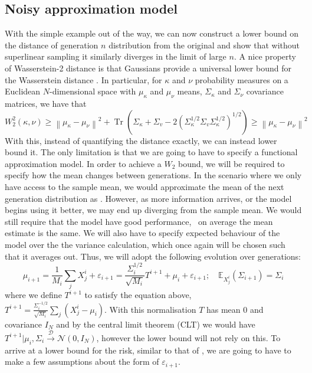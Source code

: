 \subsection{Noisy approximation model}
\label{sec:noisyapprox}
With the simple example out of the way, we can now construct a lower bound on the distance of generation $n$ distribution from the original and show that without superlinear sampling it similarly diverges in the limit of large $n$.
A nice property of Wasserstein-2 distance is that Gaussians provide a universal lower bound for the Wasserstein distance \citep{gelbrich1990formula}. In particular, for $\kappa$ and $\nu$  probability measures on a Euclidean $N$-dimensional space with $\mu_\kappa$ and $\mu_\nu$ means, $\Sigma_\kappa$ and $\Sigma_\nu$ covariance matrices, we have that
$$
W^2_2(\kappa, \nu) \geq\left\|\mu_\kappa-\mu_\nu\right\|^2+
\operatorname{Tr}\left(\Sigma_\kappa+\Sigma_v-2\left(\Sigma_\kappa^{1 / 2} \Sigma_v \Sigma_\kappa^{1 / 2}\right)^{1 / 2}\right)\geq\left\|\mu_\kappa-\mu_\nu\right\|^2
$$
With this, instead of quantifying the distance exactly, we can instead lower bound it. The only limitation is that we are going to have to specify a functional approximation model. In order to achieve a $W_2$ bound, we will be required to specify how the mean changes between generations. In the scenario where we only have access to the sample mean, we would approximate the mean of the next generation distribution as . However, as more information arrives, or the model begins using it better, we may end up diverging from the sample mean. We would still require that the model have good performance, \ie~on average the mean estimate is the same. We will also have to specify expected behaviour of the model over the the variance calculation, which once again will be chosen such that it averages out. Thus, we will adopt the following evolution over generations:
\begin{equation}
    \mu_{i+1}=\frac{1}{M_i}\sum_jX^i_j+\varepsilon_{i+1}=\frac{\Sigma^{1/2}_i}{\sqrt{M_i}}T^{i+1}+\mu_i+\varepsilon_{i+1}; \quad\mathbb{E}_{X^i_j}(\Sigma_{i+1})=\Sigma_i
\end{equation}
where we define $T^{i+1}$ to satisfy the equation above,~\ie~ $T^{i+1}=\frac{\Sigma^{-1/2}_i}{\sqrt{M_i}}\sum_j\left(X^i_j-\mu_i\right)$. With this normalisation $T$ has mean $0$ and covariance $I_N$ and by the central limit theorem (CLT) we would have $T^{i+1}|\mu_i,\Sigma_i\overset{\mathcal{D}}{\to}\mathcal{N}(0,I_N)$, however the lower bound will not rely on this.  
To arrive at a lower bound for the risk, similar to that of , we are going to have to make a few assumptions about the form of $\varepsilon_{i+1}$.\\
